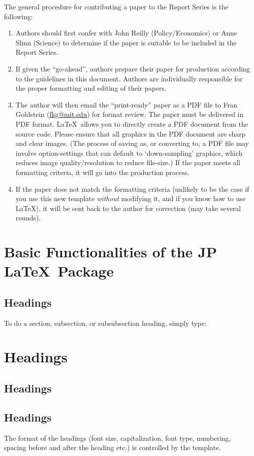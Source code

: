 \documentclass[12pt,fleqn]{article}
\let\oldverbatim\verbatim
\let\oldendverbatim\endverbatim
\renewenvironment{verbatim}{\endgraf\footnotesize\singlespace\oldverbatim}{\oldendverbatim\endsinglespace}
\begin{document}
The general procedure for contributing a paper to the Report Series is the
following:
\begin{enumerate}
  \item Authors should first confer with John Reilly (Policy/Economics) or Anne
  Slinn (Science) to determine if the paper is suitable to be included in the
  Report Series.
  \item If given the ``go-ahead'', authors prepare their paper for production 
  according to the guidelines in this document. Authors are individually 
  responsible for the proper formatting and editing of their papers.
  \item The author will then email the ``print-ready'' paper as a PDF file to 
  Fran Goldstein (\href{mailto:fkg@mit.edu}{fkg@mit.edu}) for format review. 
  The paper must be delivered in PDF format. \LaTeX\, allows you to directly 
  create a PDF document from the source code. Please ensure that all graphics 
  in the PDF document are sharp and clear images. (The process of saving as, or 
  converting to, a PDF file may involve option-settings that can default to 
  `down-sampling' graphics, which reduces image quality/resolution to reduce 
  file-size.) If the paper meets all formatting criteria, it will go into the 
  production process.
  \item If the paper does not match the formatting criteria (unlikely to be the 
  case if you use this new template \emph{without} modifying it, and if you 
  know how to use \LaTeX), it will be sent back to the author for correction 
  (may take several rounds).
\end{enumerate}

\section{Basic Functionalities of the JP \LaTeX\, Package}

\subsection{Headings}

To do a section, subsection, or subsubsection heading, simply type:
\begin{verbatim}
\section{Headings}
\subsection{Headings}
\subsection{Headings}
\end{verbatim}
The format of the headings (font size, capitalization, font type, numbering, 
spacing before and after the heading etc.) is controlled by the template.
\end{document}
